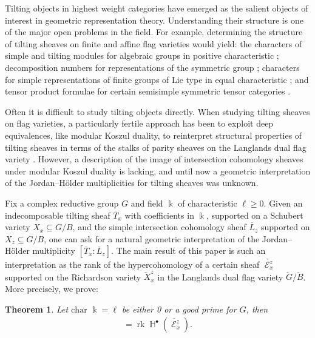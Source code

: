 \documentclass[11pt]{article}
\DeclareMathOperator{\bH}{\mathbb{H}}
\DeclareMathOperator{\sE}{\mathscr{E}}
\DeclareMathOperator{\rank}{rk}
\newtheorem{thm}{Theorem}
\theoremstyle{remark}
\theoremstyle{definition}
\begin{document}
    Tilting objects in highest weight categories have emerged as the salient objects of interest in geometric representation theory. 
	Understanding their structure is one of the major open problems in the field. 
	For example, determining the structure of tilting sheaves on finite and affine flag varieties would yield: the characters of simple and tilting modules for algebraic groups in positive characteristic \cite{AMRW19, RW21}; decomposition numbers for representations of the symmetric group \cite{Erd94}; characters for simple representations of finite groups of Lie type in equal characteristic \cite{Ste63}; and tensor product formulae for certain semisimple symmetric tensor categories \cite{GK92}.
	\\
	\par 
	Often it is difficult to study tilting objects directly. 
	When studying tilting sheaves on flag varieties, a particularly fertile approach has been to exploit deep equivalences, like modular Koszul duality, to reinterpret structural properties of tilting sheaves in terms of the stalks of parity sheaves on the Langlands dual flag variety \cite{AMRW19}. 
    However, a description of the image of intersection cohomology sheaves under modular Koszul duality is lacking, and until now  a geometric interpretation of the Jordan--H\"{o}lder multiplicities for tilting sheaves was unknown.
	\\
    \par 
	Fix a complex reductive group $G$ and field $\Bbbk$ of characteristic $\ell\geq 0$. Given an indecomposable tilting sheaf $\overline{T}_x$ with coefficients in $\Bbbk$, supported on a Schubert variety $X_x \subseteq G/B$, and the simple intersection cohomology sheaf $\overline{L}_z$ supported on $X_z \subseteq G/B$, one can ask for a natural geometric interpretation of the Jordan--H\"{o}lder multiplicity $[\overline{T}_x : \overline{L}_z]$. 
	The main result of this paper is such an interpretation as the rank of the hypercohomology of a certain sheaf  $\check{\sE_x^z}$ supported on the Richardson variety $\check{X}_x^z$ in the Langlands dual flag variety $\check{G}/\check{B}$. 
	More precisely, we prove:
	
	\begin{thm}
\label{Thm: Ungraded multiplicities}
		Let $\text{char } \Bbbk = \ell$ be either 0 or a good prime for $G$, then 
		\begin{align*}
			[\overline{T}_x: \overline{L}_z] 
			= 
			\rank\bH^{\bullet}(\check{\sE_x^z}). 
		\end{align*}
	\end{thm}
	
\end{document}
